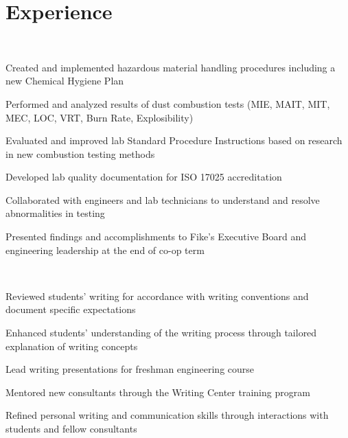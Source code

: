 \documentclass[]{deedy-resume-openfont}
\begin{document}
\begin{minipage}[t]{0.66\textwidth} 

\sectionsep
\section{Experience}
\sectionsep
{} 
\sectionsep \\
\vspace{\topsep} %
\begin{tightemize}
	\item Created and implemented hazardous material handling procedures including a new Chemical Hygiene Plan
	\item Performed and analyzed results of dust combustion tests (MIE, MAIT, MIT, MEC, LOC, VRT, Burn Rate, Explosibility)
	\item Evaluated and improved lab Standard Procedure Instructions based on research in new combustion testing methods 
	\item Developed lab quality documentation for ISO 17025 accreditation
	\item Collaborated with engineers and lab technicians to understand and resolve abnormalities in testing
	\item Presented findings and accomplishments to Fike's Executive Board and engineering leadership at the end of co-op term
\end{tightemize}
\sectionsep
\sectionsep
\sectionsep
{} 
\sectionsep\\
\begin{tightemize}
	\item Reviewed students' writing for accordance with writing conventions and document specific expectations
	\item Enhanced students' understanding of the writing process through tailored explanation of writing concepts
	\item Lead writing presentations for freshman engineering course
	\item Mentored new consultants through the Writing Center training program
	\item Refined personal writing and communication skills through interactions with students and fellow consultants

\end{tightemize}
\end{minipage}
\end{document}
